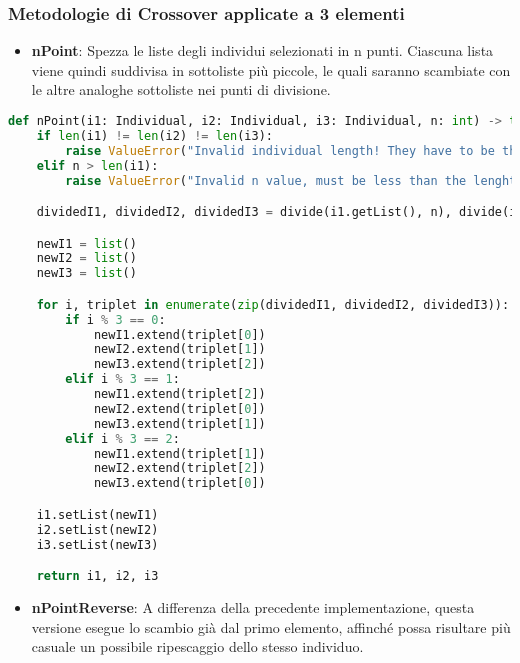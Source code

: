 \documentclass{article}
\begin{document}
\subsubsection {Metodologie di Crossover applicate a 3 elementi}

\begin{itemize}
\item\textbf{nPoint}: Spezza le liste degli individui selezionati in n punti. Ciascuna lista viene quindi suddivisa in sottoliste più piccole, le quali saranno scambiate con le altre analoghe sottoliste nei punti di divisione.
\end{itemize}

\begin{lstlisting}[language=Python, breaklines, no caption]
def nPoint(i1: Individual, i2: Individual, i3: Individual, n: int) -> tuple[Individual, Individual, Individual]:
    if len(i1) != len(i2) != len(i3):
        raise ValueError("Invalid individual length! They have to be the same.")
    elif n > len(i1):
        raise ValueError("Invalid n value, must be less than the lenght of the individual!")

    dividedI1, dividedI2, dividedI3 = divide(i1.getList(), n), divide(i2.getList(), n), divide(i3.getList(), n)

    newI1 = list()
    newI2 = list()
    newI3 = list()

    for i, triplet in enumerate(zip(dividedI1, dividedI2, dividedI3)):
        if i % 3 == 0:
            newI1.extend(triplet[0])
            newI2.extend(triplet[1])
            newI3.extend(triplet[2])
        elif i % 3 == 1:
            newI1.extend(triplet[2])
            newI2.extend(triplet[0])
            newI3.extend(triplet[1])
        elif i % 3 == 2:
            newI1.extend(triplet[1])
            newI2.extend(triplet[2])
            newI3.extend(triplet[0])

    i1.setList(newI1)
    i2.setList(newI2)
    i3.setList(newI3)

    return i1, i2, i3
\end{lstlisting}
\pagebreak

\begin{itemize}
\item\textbf{nPointReverse}: A differenza della precedente implementazione, questa versione esegue lo scambio già dal primo elemento, affinché possa risultare più casuale un possibile ripescaggio dello stesso individuo.
\end{itemize}
\end{document}
